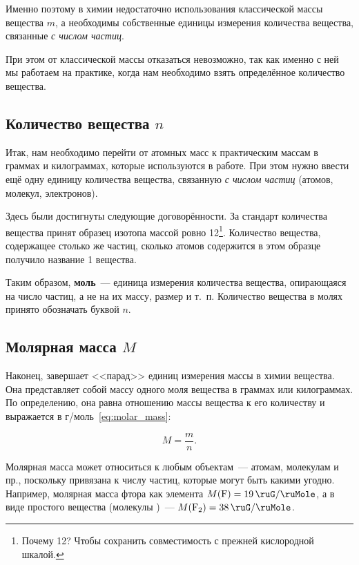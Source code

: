 Именно поэтому в химии недостаточно использования классической массы вещества $m$, а необходимы собственные единицы измерения количества вещества, связанные \emph{с числом частиц}.

При этом от классической массы отказаться невозможно, так как именно с ней мы работаем на практике, когда нам необходимо взять определённое количество вещества.

\subsection*{\protect{} Количество вещества $n$}\label{term:amount_of_substance}

Итак, нам необходимо перейти от атомных масс к практическим массам в граммах и килограммах, которые используются в работе. При этом нужно ввести ещё одну единицу количества вещества, связанную \emph{с числом частиц} (атомов, молекул, электронов).

Здесь были достигнуты следующие договорённости. За стандарт количества вещества принят образец изотопа  массой ровно \qty{12}{\ruG}\footnote{Почему 12? Чтобы сохранить совместимость с прежней кислородной шкалой.}. Количество вещества, содержащее столько же частиц, сколько атомов содержится в этом образце получило название \qty{1}{\ruMole} вещества.

Таким образом, \textbf{моль}~--- единица измерения количества вещества, опирающаяся на число частиц, а не на их массу, размер и т.~п. Количество вещества в молях принято обозначать буквой $n$.

\subsection*{Молярная масса $M$}

Наконец, завершает <<парад>> единиц измерения массы в химии  вещества. Она представляет собой массу одного моля вещества в граммах или килограммах. По определению, она равна отношению массы вещества к его количеству и выражается в г/моль~\eqref{eq:molar_mass}:

\begin{equation}
    \label{eq:molar_mass}
    \boxed{M = \frac{m}{n}}.
\end{equation}

Молярная масса может относиться к любым объектам~--- атомам, молекулам и пр., поскольку привязана к числу частиц, которые могут быть какими угодно. Например, молярная масса фтора как элемента $M(\ce{F}) = \qty{19}{\ruG\per\ruMole}$, а в виде простого вещества (молекулы )~--- $M(\ce{F2}) = \qty{38}{\ruG\per\ruMole}$.

